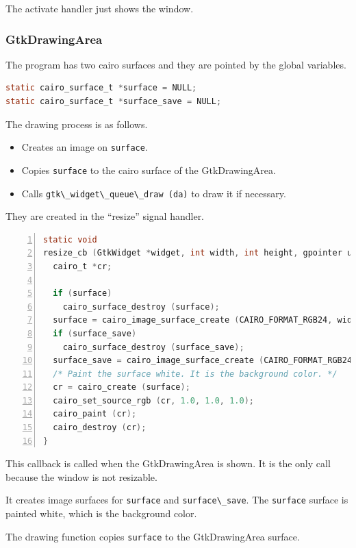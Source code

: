 The activate handler just shows the window.

\subsubsection{GtkDrawingArea}\label{gtkdrawingarea}

The program has two cairo surfaces and they are pointed by the global
variables.

\begin{lstlisting}[language=C]
static cairo_surface_t *surface = NULL;
static cairo_surface_t *surface_save = NULL;
\end{lstlisting}

The drawing process is as follows.

\begin{itemize}
\tightlist
\item
  Creates an image on \passthrough{\lstinline!surface!}.
\item
  Copies \passthrough{\lstinline!surface!} to the cairo surface of the
  GtkDrawingArea.
\item
  Calls \passthrough{\lstinline!gtk\_widget\_queue\_draw (da)!} to draw
  it if necessary.
\end{itemize}

They are created in the ``resize'' signal handler.

\begin{lstlisting}[language=C, numbers=left]
static void
resize_cb (GtkWidget *widget, int width, int height, gpointer user_data) {
  cairo_t *cr;

  if (surface)
    cairo_surface_destroy (surface);
  surface = cairo_image_surface_create (CAIRO_FORMAT_RGB24, width, height);
  if (surface_save)
    cairo_surface_destroy (surface_save);
  surface_save = cairo_image_surface_create (CAIRO_FORMAT_RGB24, width, height);
  /* Paint the surface white. It is the background color. */
  cr = cairo_create (surface);
  cairo_set_source_rgb (cr, 1.0, 1.0, 1.0);
  cairo_paint (cr);
  cairo_destroy (cr);
}
\end{lstlisting}

This callback is called when the GtkDrawingArea is shown. It is the only
call because the window is not resizable.

It creates image surfaces for \passthrough{\lstinline!surface!} and
\passthrough{\lstinline!surface\_save!}. The
\passthrough{\lstinline!surface!} surface is painted white, which is the
background color.

The drawing function copies \passthrough{\lstinline!surface!} to the
GtkDrawingArea surface.

